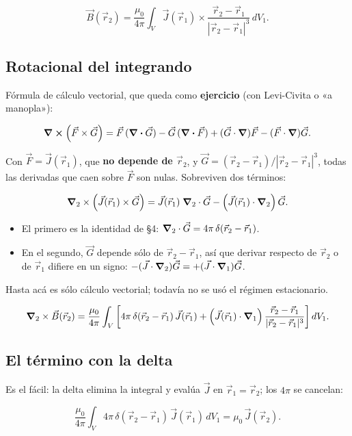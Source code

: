 \documentclass[12pt,a4paper]{article}
\begin{document}
\[
\vec B(\vec r_2) = \frac{\mu_0}{4\pi}\int_V
\vec J(\vec r_1)\times\frac{\vec r_2-\vec r_1}{|\vec r_2-\vec r_1|^3}\,dV_1 .
\]

\subsection{Rotacional del integrando}

Fórmula de cálculo vectorial, que queda como \textbf{ejercicio} (con Levi-Civita o
«a manopla»):

\[
\curl (\vec F\times\vec G)
= \vec F\,(\div \vec G) - \vec G\,(\div \vec F)
+ (\vec G\cdot\vnabla)\vec F - (\vec F\cdot\vnabla)\vec G .
\]

Con $\vec F = \vec J(\vec r_1)$, que \textbf{no depende de $\vec r_2$}, y
$\vec G = (\vec r_2-\vec r_1)/|\vec r_2-\vec r_1|^3$, todas las derivadas que
caen sobre $\vec F$ son nulas. Sobreviven dos términos:

\[
\vnabla_2\times\left(\vec J(\vec r_1)\times\vec G\right)
= \vec J(\vec r_1)\;\vnabla_2\cdot\vec G - \left(\vec J(\vec r_1)\cdot\vnabla_2\right)\vec G .
\]

\begin{itemize}
  \item El primero es la identidad de §4:
  $\vnabla_2\cdot\vec G = 4\pi\,\delta(\vec r_2-\vec r_1)$.
  \item En el segundo, $\vec G$ depende sólo de $\vec r_2-\vec r_1$, así que derivar
  respecto de $\vec r_2$ o de $\vec r_1$ difiere en un signo:
  $-(\vec J\cdot\vnabla_2)\vec G = +(\vec J\cdot\vnabla_1)\vec G$.
\end{itemize}

Hasta acá es sólo cálculo vectorial; todavía no se usó el régimen estacionario.

\[
\vnabla_2\times\vec B(\vec r_2) = \frac{\mu_0}{4\pi}\int_V\left[
4\pi\,\delta(\vec r_2-\vec r_1)\,\vec J(\vec r_1)
+ \left(\vec J(\vec r_1)\cdot\vnabla_1\right)
\frac{\vec r_2-\vec r_1}{|\vec r_2-\vec r_1|^3}\right]dV_1 .
\]

\subsection{El término con la delta}

Es el fácil: la delta elimina la integral y evalúa $\vec J$ en
$\vec r_1 = \vec r_2$; los $4\pi$ se cancelan:

\[
\frac{\mu_0}{4\pi}\int_V 4\pi\,\delta(\vec r_2-\vec r_1)\,\vec J(\vec r_1)\,dV_1
= \mu_0\,\vec J(\vec r_2).
\]
\end{document}
